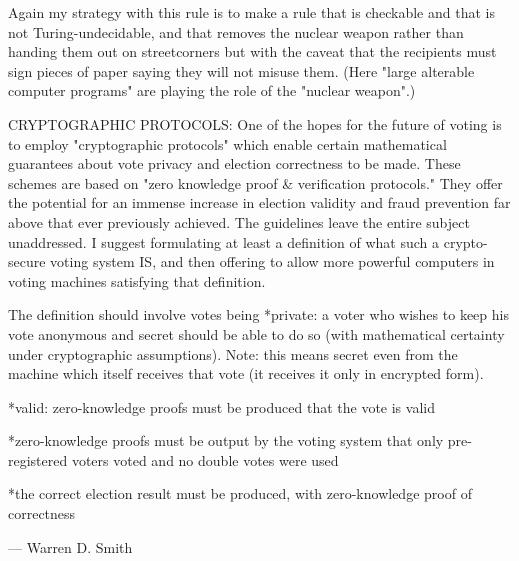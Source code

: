 Again my strategy with this rule is to make a rule that is checkable
and that is not Turing-undecidable, and that removes the nuclear weapon
rather than handing them out on streetcorners but with the caveat that the 
recipients must sign pieces of paper saying they will not misuse them.
(Here "large alterable computer programs" are playing the role of the
"nuclear weapon".)

CRYPTOGRAPHIC PROTOCOLS:
One of the hopes for the future of voting is to employ "cryptographic protocols" which 
enable certain mathematical guarantees about vote privacy and election correctness to be made.
These schemes are based on "zero knowledge proof & verification protocols."
They offer the potential for an immense increase in election validity and fraud prevention
far above that ever previously achieved.  The guidelines leave the entire subject unaddressed.
I suggest formulating at least a definition of what such a crypto-secure voting system IS,
and then offering to allow more powerful computers in voting machines satisfying that definition.

The definition should involve votes being 
  *private: a voter who wishes to keep his vote anonymous and secret should be able to do so
  (with mathematical certainty under cryptographic assumptions).   Note: this means
  secret even from the machine which itself receives that vote (it receives it only
  in encrypted form).

  *valid: zero-knowledge proofs must be produced that the vote is valid

  *zero-knowledge proofs must be output by the voting system that only pre-registered voters voted and
   no double votes were used

  *the correct election result must be produced, with zero-knowledge proof of correctness

---
Warren D. Smith
